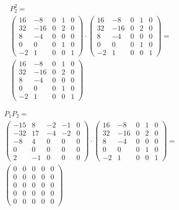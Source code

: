 \documentclass[12pt, a4paper]{article}
\begin{document}
    \begin{multline}
        P_2^2 = \\
        \left(\begin{matrix}
            16 & -8 & 0 & 1 & 0 \\
            32 & -16 & 0 & 2 & 0 \\
            8 & -4 & 0 & 0 & 0 \\
            0 & 0 & 0 & 1 & 0 \\
            -2 & 1 & 0 & 0 & 1
        \end{matrix}\right) \cdot \left(\begin{matrix}
            16 & -8 & 0 & 1 & 0 \\
            32 & -16 & 0 & 2 & 0 \\
            8 & -4 & 0 & 0 & 0 \\
            0 & 0 & 0 & 1 & 0 \\
            -2 & 1 & 0 & 0 & 1
        \end{matrix}\right) = \\ \left(\begin{matrix}
            16 & -8 & 0 & 1 & 0 \\
            32 & -16 & 0 & 2 & 0 \\
            8 & -4 & 0 & 0 & 0 \\
            0 & 0 & 0 & 1 & 0 \\
            -2 & 1 & 0 & 0 & 1
        \end{matrix}\right)
    \end{multline}

    \begin{multline}
        P_1P_2 = \\
        \left(\begin{matrix}
            -15 & 8 & -2 & -1 & 0 \\
            -32 & 17 & -4 & -2 & 0 \\
            -8 & 4 & 0 & 0 & 0 \\
            0 & 0 & 0 & 0 & 0 \\
            2 & -1 & 0 & 0 & 0
        \end{matrix}\right) \cdot \left(\begin{matrix}
            16 & -8 & 0 & 1 & 0 \\
            32 & -16 & 0 & 2 & 0 \\
            8 & -4 & 0 & 0 & 0 \\
            0 & 0 & 0 & 1 & 0 \\
            -2 & 1 & 0 & 0 & 1
        \end{matrix}\right) = \\
        \left(\begin{matrix}
            0 & 0 & 0 & 0 & 0 \\
            0 & 0 & 0 & 0 & 0 \\
            0 & 0 & 0 & 0 & 0 \\
            0 & 0 & 0 & 0 & 0 \\
            0 & 0 & 0 & 0 & 0
        \end{matrix}\right)
    \end{multline}
\end{document}
